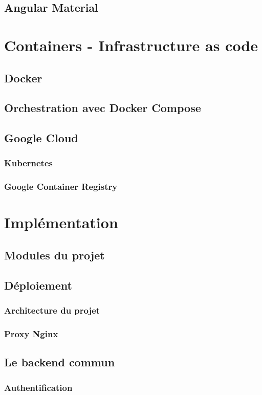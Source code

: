 \documentclass[11pt,a4paper]{report}
\begin{document}
\section{Angular Material}
\chapter{Containers - Infrastructure as code}
\section{Docker}
\section{Orchestration avec Docker Compose}
\section{Google Cloud}
\subsection{Kubernetes}
\subsection{Google Container Registry}
\chapter{Implémentation}
\section{Modules du projet}
\section{Déploiement}
\subsection{Architecture du projet}
\subsection{Proxy Nginx}
\section{Le backend commun}
\subsection{Authentification}
\end{document}
